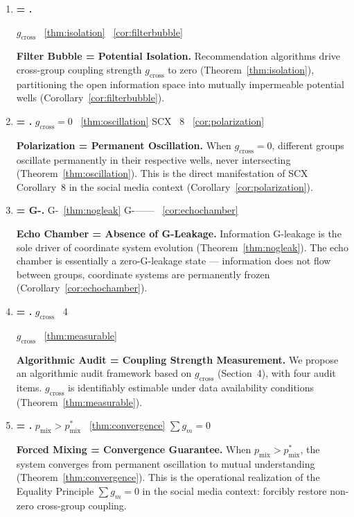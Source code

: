 \documentclass[11pt,a4paper]{article}
\theoremstyle{remark}
\newcommand{\GCoupling}{g_{\text{cross}}}
\begin{document}
\begin{enumerate}[label=(\arabic*)]
\item \textbf{ = .}

 $\GCoupling$ ~\ref{thm:isolation}
~\ref{cor:filterbubble}

\textbf{Filter Bubble = Potential Isolation.}
Recommendation algorithms drive cross-group coupling strength $\GCoupling$ to zero
(Theorem~\ref{thm:isolation}), partitioning the open information space into mutually
impermeable potential wells (Corollary~\ref{cor:filterbubble}).

\medskip
\item \textbf{ = .}
 $\GCoupling = 0$ 
~\ref{thm:oscillation}
 SCX ~8 
~\ref{cor:polarization}

\textbf{Polarization = Permanent Oscillation.}
When $\GCoupling = 0$, different groups oscillate permanently in their respective
wells, never intersecting (Theorem~\ref{thm:oscillation}). This is the direct
manifestation of SCX Corollary~8 in the social media context
(Corollary~\ref{cor:polarization}).

\medskip
\item \textbf{ = G-.}
G-~\ref{thm:nogleak}
G-——
~\ref{cor:echochamber}

\textbf{Echo Chamber = Absence of G-Leakage.}
Information G-leakage is the sole driver of coordinate system evolution
(Theorem~\ref{thm:nogleak}). The echo chamber is essentially a zero-G-leakage state ---
information does not flow between groups, coordinate systems are permanently frozen
(Corollary~\ref{cor:echochamber}).

\medskip
\item \textbf{ = .}
 $\GCoupling$ ~4 

$\GCoupling$ ~\ref{thm:measurable}

\textbf{Algorithmic Audit = Coupling Strength Measurement.}
We propose an algorithmic audit framework based on $\GCoupling$ (Section~4), with four
audit items. $\GCoupling$ is identifiably estimable under data availability conditions
(Theorem~\ref{thm:measurable}).

\medskip
\item \textbf{ = .}
 $p_{\text{mix}} > p_{\text{mix}}^*$ 
~\ref{thm:convergence}
 $\sum g_m = 0$ 


\textbf{Forced Mixing = Convergence Guarantee.}
When $p_{\text{mix}} > p_{\text{mix}}^*$, the system converges from permanent
oscillation to mutual understanding (Theorem~\ref{thm:convergence}). This is the
operational realization of the Equality Principle $\sum g_m = 0$ in the social media
context: forcibly restore non-zero cross-group coupling.
\end{enumerate}
\end{document}
